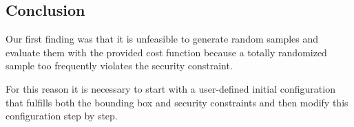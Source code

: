 \documentclass{article}
\begin{document}
\subsection{Conclusion}
Our first finding was that it is unfeasible to generate random samples and evaluate them with the provided cost function because a totally randomized sample too frequently violates the security constraint.

For this reason it is necessary to start with a user-defined initial configuration that fulfills both the bounding box and security constraints and then modify this configuration step by step.


\end{document}
